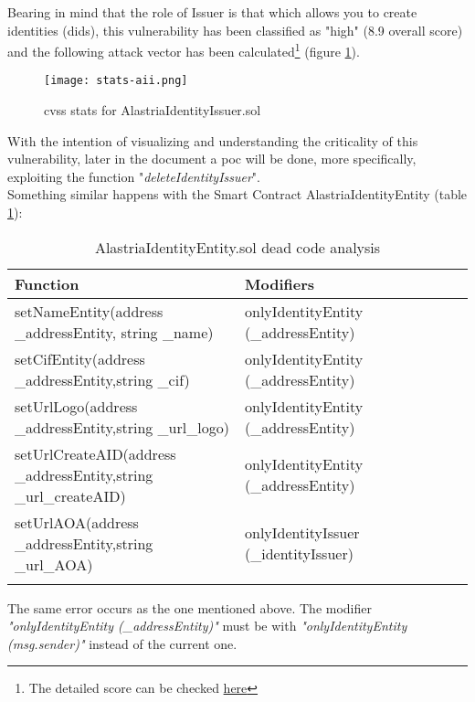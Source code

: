 Bearing in mind that the role of Issuer is that which allows you to create identities (\acrshort{did}s), this vulnerability has been classified as "high" (8.9 overall score) and the following attack vector has been calculated\footnote{The detailed score can be checked \href{https://nvd.nist.gov/vuln-metrics/cvss/v3-calculator?vector=AV:N/AC:L/PR:H/UI:N/S:C/C:N/I:H/A:H/E:F/RL:O/RC:R/CR:X/IR:H/AR:H/MAV:N/MAC:L/MPR:N/MUI:N/MS:C/MC:X/MI:H/MA:H&version=3.1}{here}} (figure \ref{fig:stats-aii}).\\
\begin{figure}[h]
    \centering
    \texttt{[image: stats-aii.png]}
    \caption{\acrshort{cvss} stats for AlastriaIdentityIssuer.sol}
    \label{fig:stats-aii}
\end{figure}

With the intention of visualizing and understanding the criticality of this vulnerability, later in the document a \acrfull{poc} will be done, more specifically, exploiting the function "\textit{deleteIdentityIssuer}".\\

Something similar happens with the Smart Contract AlastriaIdentityEntity (table \ref{tab:dead-code-entity}):
\newpage
\begin{longtable}{||p{0.5\linewidth} | p{0.5\linewidth}||}
    \hline
    \textbf{Function}                                                                  & \textbf{Modifiers}                    \\ [0.5ex]
    \hline\hline
    setNameEntity\newline (address \_addressEntity, string \_name)                     & onlyIdentityEntity (\_addressEntity)  \\
    \hline
    setCifEntity\newline (address \_addressEntity,\newline string \_cif)               & onlyIdentityEntity (\_addressEntity)  \\
    \hline
    setUrlLogo\newline (address \_addressEntity,\newline string \_url\_logo)           & onlyIdentityEntity (\_addressEntity)  \\
    \hline
    setUrlCreateAID\newline (address \_addressEntity,\newline string \_url\_createAID) & onlyIdentityEntity (\_addressEntity)  \\
    \hline
    setUrlAOA\newline (address \_addressEntity,\newline string \_url\_AOA)             & onlyIdentityIssuer (\_identityIssuer) \\[1ex]
    \hline
    \caption{AlastriaIdentityEntity.sol dead code analysis}
    \label{tab:dead-code-entity}
\end{longtable}
The same error occurs as the one mentioned above. The modifier \textit{"onlyIdentityEntity (\_addressEntity)"} must be with \textit{"onlyIdentityEntity (msg.sender)"} instead of the current one.\\

